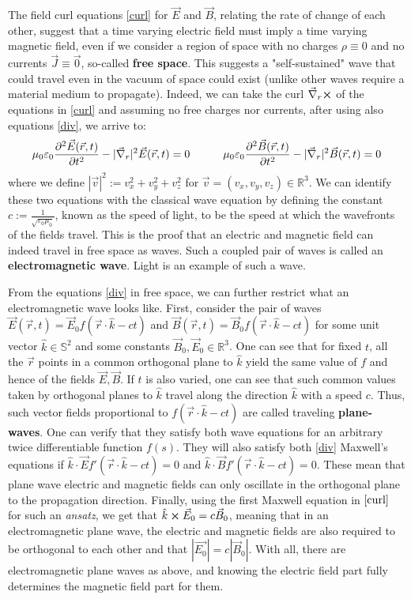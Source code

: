 \documentclass[11pt, a4paper, twoside]{article} %
\newcommand{\R}{\mathbb{R}} %
\begin{document}
The field curl equations \eqref{curl} for $\vec{E}$ and $\vec{B}$, relating the rate of change of each other, suggest that a time varying electric field must imply a time varying magnetic field, even if we consider a region of space with no charges $\rho\equiv 0$ and no currents $\vec{J}\equiv\vec{0}$, so-called {\bf free space}. This suggests a "self-sustained" wave that could travel even in the vacuum of space could exist (unlike other waves require a material medium to propagate). Indeed, we can take the curl $\vec{\nabla}_r\cross$ of the equations in \eqref{curl} and assuming no free charges nor currents, after using also equations \eqref{div}, we arrive to:\vspace{-0.2cm}
\begin{equation}\label{waveeq}
\mu_0\varepsilon_0\pdv[2]{\vec{E}(\vec{r},t)}{t}-|\vec{\nabla}_r|^2\vec{E}(\vec{r},t)=0 \quad \quad \quad \mu_0\varepsilon_0\pdv[2]{\vec{B}(\vec{r},t)}{t}- |\vec{\nabla}_r|^2\vec{B}(\vec{r},t)=0 \vspace{-0.2cm}
\end{equation}
where we define $|\vec{v}|^2:=v_x^2+v_y^2+v_z^2$ for $\vec{v}=(v_x,v_y,v_z)\in\R^3$. We can identify these two equations with the classical wave equation by defining the constant $c:=\frac{1}{\sqrt{\varepsilon_0\mu_0}}$, known as the speed of light, to be the speed at which the wavefronts of the fields travel. This is the proof that an electric and magnetic field can indeed travel in free space as waves. Such a coupled pair of waves is called an {\bf electromagnetic wave}. Light is an example of such a wave.

From the equations \eqref{div} in free space, we can further restrict what an electromagnetic wave looks like. First, consider the pair of waves $\vec{E}(\vec{r},t)=\vec{E}_0f(\vec{r}\cdot \hat{k}-ct)$ and $\vec{B}(\vec{r},t)=\vec{B}_0f(\vec{r}\cdot \hat{k}-ct)$ for some unit vector $\hat{k}\in\mathbb{S}^2$ and some constants $\vec{B}_0,\vec{E}_0\in\R^3$. One can see that for fixed $t$, all the $\vec{r}$ points in a common orthogonal plane to $\hat{k}$ yield the same value of $f$ and hence of the fields $\vec{E},\vec{B}$. If $t$ is also varied, one can see that such common values taken by orthogonal planes to $\hat{k}$ travel along the direction $\hat{k}$ with a speed $c$. Thus, such vector fields proportional to $f(\vec{r}\cdot\hat{k}-ct)$ are called traveling {\bf plane-waves}. One can verify that they satisfy both wave equations for an arbitrary twice differentiable function $f(s)$. They will also satisfy both \eqref{div} Maxwell's equations if $\hat{k}\cdot\vec{E}f'(\vec{r}\cdot \hat{k}-ct)=0$ and $\hat{k}\cdot\vec{B}f'(\vec{r}\cdot \hat{k}-ct)=0$. These mean that plane wave electric and magnetic fields can only oscillate in the orthogonal plane to the propagation direction. Finally, using the first Maxwell equation in $\eqref{curl}$ for such an {\em ansatz}, we get that $\hat{k}\cross \vec{E}_0 =c \vec{B}_0$, meaning that in an electromagnetic plane wave, the electric and magnetic fields are also required to be orthogonal to each other and that $|\vec{E_0}|=c|\vec{B}_0|$. With all, there are electromagnetic plane waves as above, and knowing the electric field part fully determines the magnetic field part for them. 
\end{document}
